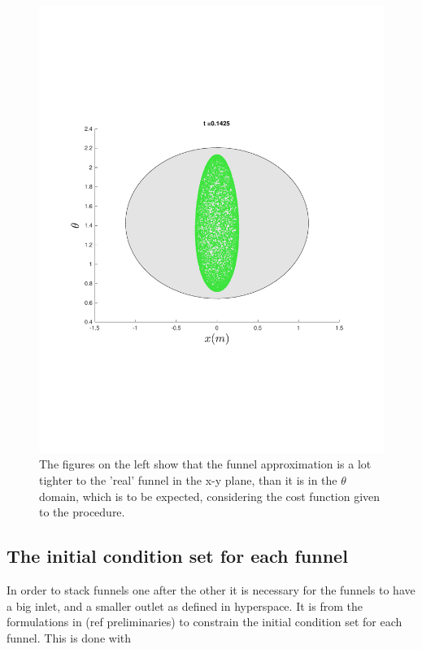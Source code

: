 \begin{figure}
{\begin{minipage}{0.5\textwidth}
\begin{minipage}[b]{0.5\textwidth}
        \includegraphics[width=\textwidth]{figures/method/FunnelSimOverlaid20funnel-1y-theta}
      \end{minipage}%
    \end{minipage}%
  }
  \caption{The figures on the left show that the funnel approximation is a lot
    tighter to the 'real' funnel in the x-y plane, than it is in the \(\theta\)
    domain, which is to be expected, considering the cost function given to the
    procedure.}
\end{figure}

\subsection{The initial condition set for each funnel}

In order to stack funnels one after the other it is necessary for the funnels to
have a big inlet, and a smaller outlet as defined in hyperspace. It is from the
formulations in (ref preliminaries) to constrain the initial condition set for
each funnel. This is done with

